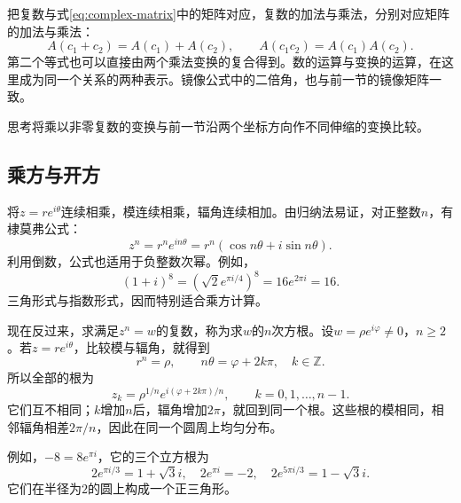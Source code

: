 把复数与式\eqref{eq:complex-matrix}中的矩阵对应，复数的加法与乘法，分别对应矩阵的加法与乘法：
\begin{equation}
    A \left( c_{1} + c_{2} \right) = A \left( c_{1} \right) + A \left( c_{2} \right) , \qquad
    A \left( c_{1} c_{2} \right) = A \left( c_{1} \right) A \left( c_{2} \right) .
\end{equation}
第二个等式也可以直接由两个乘法变换的复合得到。数的运算与变换的运算，在这里成为同一个关系的两种表示。镜像公式中的二倍角，也与前一节的镜像矩阵一致。

{\kaiti{}思考\quad 将乘以非零复数的变换与前一节沿两个坐标方向作不同伸缩的变换比较。}

\subsection{乘方与开方}
将\(z = r e^{i \theta}\)连续相乘，模连续相乘，辐角连续相加。由归纳法易证，对正整数\(n\)，有{\heiti{}棣莫弗公式}：
\begin{equation}\label{eq:de-moivre}
    z^{n} = r^{n} e^{i n \theta} = r^{n} \left( \cos n \theta + i \sin n \theta \right) .
\end{equation}
利用倒数，公式也适用于负整数次幂。例如，
\begin{equation}
    \left( 1 + i \right)^{8} = \left( \sqrt{2} e^{\pi i / 4} \right)^{8} = 16 e^{2 \pi i} = 16 .
\end{equation}
三角形式与指数形式，因而特别适合乘方计算。

现在反过来，求满足\(z^{n} = w\)的复数，称为求\(w\)的\(n\)次方根。设\(w = \rho e^{i \varphi} \ne 0\)，\(n \ge 2\)。若\(z = r e^{i \theta}\)，比较模与辐角，就得到
\begin{equation}
    r^{n} = \rho , \qquad n \theta = \varphi + 2 k \pi , \quad k \in \mathbb{Z} .
\end{equation}
所以全部的根为
\begin{equation}\label{eq:complex-nth-roots}
    z_{k} = \rho^{1 / n} e^{i \left( \varphi + 2 k \pi \right) / n} , \qquad k = 0 , 1 , \ldots , n - 1 .
\end{equation}
它们互不相同；\(k\)增加\(n\)后，辐角增加\(2 \pi\)，就回到同一个根。这些根的模相同，相邻辐角相差\(2 \pi / n\)，因此在同一个圆周上均匀分布。

\begin{samepage}
例如，\(- 8 = 8 e^{\pi i}\)，它的三个立方根为
\begin{equation}
    2 e^{\pi i / 3} = 1 + \sqrt{3} i , \quad
    2 e^{\pi i} = - 2 , \quad
    2 e^{5 \pi i / 3} = 1 - \sqrt{3} i .
\end{equation}
它们在半径为\(2\)的圆上构成一个正三角形。
\par
\end{samepage}

